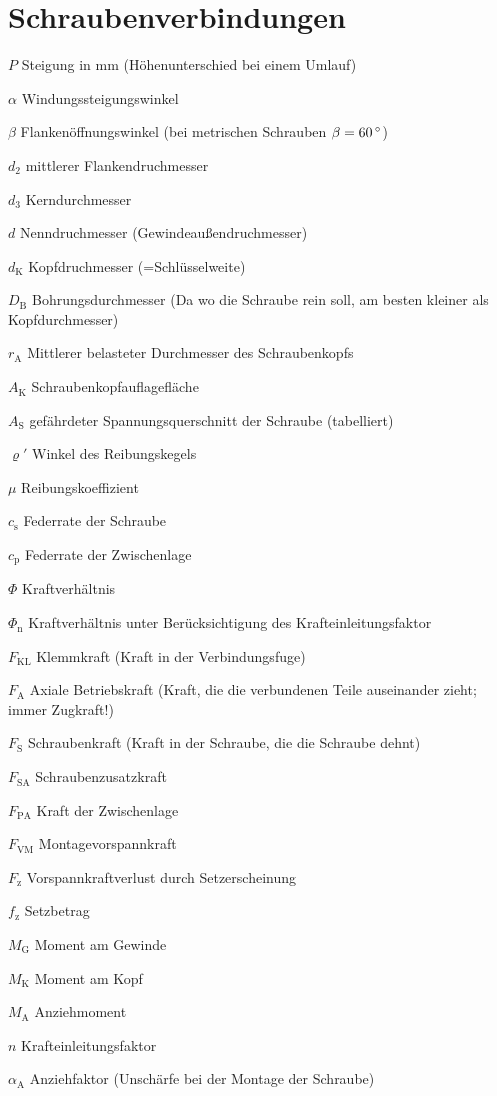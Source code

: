 \section{Schraubenverbindungen}
\begin{vardef}
	\item[$P$] Steigung in mm (Höhenunterschied bei einem Umlauf)
	\item[$\alpha$] Windungssteigungswinkel
	\item[$\beta$] Flankenöffnungswinkel (bei metrischen Schrauben $\beta=60\,^\circ$)
	\item[$d_2$] mittlerer Flankendruchmesser
	\item[$d_3$] Kerndurchmesser
	\item[$d$] Nenndruchmesser (Gewindeaußendruchmesser)
	\item[$d_\text{K}$] Kopfdruchmesser (=Schlüsselweite)
	\item[$D_\text{B}$] Bohrungsdurchmesser (Da wo die Schraube rein soll, am besten kleiner als Kopfdurchmesser)
	\item[$r_\text{A}$] Mittlerer belasteter Durchmesser des Schraubenkopfs
	\item[$A_\text{K}$] Schraubenkopfauflagefläche
	\item[$A_\text{S}$] gefährdeter Spannungsquerschnitt der Schraube (tabelliert)
	\item[$\varrho'$] Winkel des Reibungskegels
	\item[$\mu$] Reibungskoeffizient
	\item[$c_\text{s}$] Federrate der Schraube
	\item[$c_\text{p}$] Federrate der Zwischenlage
	\item[$\Phi$] Kraftverhältnis
	\item[$\Phi_\text{n}$] Kraftverhältnis unter Berücksichtigung des Krafteinleitungsfaktor
	\item[$F_\text{KL}$] Klemmkraft (Kraft in der Verbindungsfuge)
	\item[$F_\text{A}$] Axiale Betriebskraft (Kraft, die die verbundenen Teile auseinander zieht; immer Zugkraft!)
	\item[$F_\text{S}$] Schraubenkraft (Kraft in der Schraube, die die Schraube dehnt)
	\item[$F_\text{SA}$] Schraubenzusatzkraft	\item[$F_\text{PA}$] Kraft der Zwischenlage
	\item[$F_\text{VM}$] Montagevorspannkraft
	\item[$F_\text{z}$] Vorspannkraftverlust durch Setzerscheinung
	\item[$f_\text{z}$] Setzbetrag
	\item[$M_\text{G}$] Moment am Gewinde
	\item[$M_\text{K}$] Moment am Kopf
	\item[$M_\text{A}$] Anziehmoment
	\item[$n$] Krafteinleitungsfaktor
	\item[$\alpha_\text{A}$] Anziehfaktor (Unschärfe bei der Montage der Schraube)
\end{vardef}

